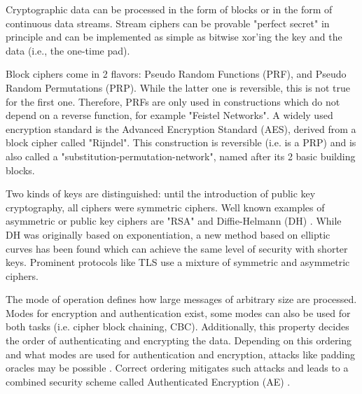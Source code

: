 \documentclass[a4paper,11pt,oneside]{memoir}
\begin{document}
Cryptographic data can be processed in the form of blocks or in the form of continuous
data streams. Stream ciphers can be provable "perfect secret" in principle
and can be implemented as simple as bitwise xor'ing the key and the data (i.e., the one-time pad). 

Block ciphers come in 2 flavors: Pseudo Random Functions (PRF), and Pseudo Random Permutations (PRP). While the latter one is reversible,
this is not true for the first one. Therefore, PRFs are only used in constructions which do not depend on a reverse function, for
example "Feistel Networks". A widely used encryption standard is the Advanced Encryption Standard (AES), derived from a block cipher
called "Rijndel".
This construction is reversible (i.e. is a PRP) and is also called a "substitution-permutation-network", named after its 2 basic building blocks.
 
 Two kinds of keys are distinguished: until the introduction of public key cryptography, all ciphers were symmetric ciphers.
 Well known examples
 of asymmetric or public key ciphers are "RSA" \cite{Rivest:1978:MOD:359340.359342} and Diffie-Helmann (DH) \cite{1055638}. 
 While DH was originally based on exponentiation,
 a new method based on elliptic curves has been found which can achieve the same level of security with shorter keys.
 Prominent protocols like TLS \cite{rfc2246} use a mixture of symmetric and asymmetric ciphers.
 
 
 The mode of operation defines how large messages of arbitrary size are processed.
 Modes for encryption and authentication exist, some modes can also be used for both tasks (i.e. cipher block chaining, CBC). Additionally, this property 
 decides the order of authenticating and encrypting the data. Depending on this ordering and
 what modes are used for authentication and encryption, attacks like padding oracles may be possible \cite{Vaudenay02securityflaws}. Correct ordering
 mitigates such attacks \cite{cryptoeprint} and leads to a combined security scheme called Authenticated Encryption (AE) \cite{ocb}.
 
\end{document}

